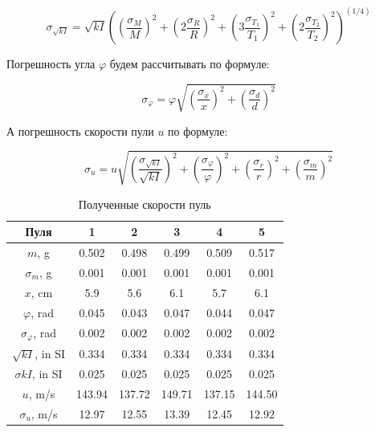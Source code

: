 \documentclass[a4paper,12pt]{article}
\begin{document}
	\begin{equation}
		\label{sigmakI}
		\sigma_{\sqrt{kI}}=\sqrt{kI}\left(\left(\frac{\sigma_M}{M}\right)^2+\left(2\frac{\sigma_R}{R}\right)^2+ \left(3\frac{\sigma_{T_1}}{T_1}\right)^2+\left(2\frac{\sigma_{T_2}}{T_2}\right)^2\right)^{(1/4)}
	\end{equation}
	
	Погрешность угла $\varphi$ будем рассчитывать по формуле:
	
	\begin{equation}
		\label{sigmavarphi}
		\sigma_{\varphi}=\varphi \sqrt{\left(\frac{\sigma_x}{x}\right)^2+\left(\frac{\sigma_d}{d}\right)^2}
	\end{equation}
	
	А погрешность скорости пули $u$ по формуле:
	
	\begin{equation}
		\label{sigmau2}
		\sigma_u=u\sqrt{\left(\frac{\sigma_{\sqrt{kI}}}{\sqrt{kI}}\right)^2+\left(\frac{\sigma_{\varphi}}{\varphi}\right)^2+\left(\frac{\sigma_r}{r}\right)^2+\left(\frac{\sigma_m}{m}\right)^2}
	\end{equation}
	
	\begin{table}[H]
		\centering
		\begin{tabular}{|c|c|c|c|c|c|}
			\hline
			Пуля & 1 & 2 & 3 & 4 & 5 \\
			\hline
			$m$, g & 0.502 & 0.498 & 0.499 & 0.509 & 0.517 \\
			\hline
			$\sigma_m$, g & 0.001 & 0.001 & 0.001 & 0.001 & 0.001 \\
			\hline
			$x$, cm & 5.9 & 5.6 & 6.1 & 5.7 & 6.1 \\
			\hline
			$\varphi$, rad & 0.045 & 0.043 & 0.047 & 0.044 & 0.047 \\
			\hline
			$\sigma_\varphi$, rad & 0.002 & 0.002 & 0.002 & 0.002 & 0.002 \\
			\hline
			$\sqrt{kI}$, in SI & 0.334 & 0.334 & 0.334 & 0.334 & 0.334 \\
			\hline
			$\sigma{kI}$, in SI & 0.025 & 0.025 & 0.025 & 0.025 & 0.025 \\
			\hline
			$u$, m/s & 143.94 & 137.72 & 149.71 & 137.15 & 144.50 \\
			\hline
			$\sigma_u$, m/s & 12.97 & 12.55 & 13.39 & 12.45 & 12.92 \\
			\hline
		\end{tabular}
		\caption{Полученные скорости пуль}
	\end{table}
	
\end{document}
